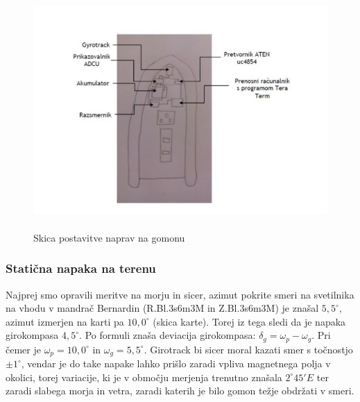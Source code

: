 \begin{figure}
	\centering
	\includegraphics[height=9cm]{Vaje/VzorecPoroc/figs/Razporeditev_opreme.pdf}
	\caption{Skica postavitve naprav na gomonu}
	\label{fig:gum_tloris}       %
\end{figure}


\subsubsection{Statična napaka na terenu}
Najprej smo opravili meritve na morju in sicer, azimut pokrite smeri na svetilnika na vhodu v mandrač Bernardin (R.Bl.3s6m3M in Z.Bl.3s6m3M) je znašal $5,5^{\circ}$, azimut izmerjen na karti pa $10,0^{\circ}$ (skica karte). Torej iz tega sledi da je napaka girokompasa $4,5^{\circ}$. Po formuli znaša deviacija girokompasa: $\delta_g = \omega_p - \omega_g$. Pri čemer je $\omega_p = 10,0^{\circ}$ in $\omega_g = 5,5^{\circ}$.
Girotrack bi sicer moral kazati smer s točnostjo $\pm 1^{\circ}$, vendar je do take napake lahko prišlo zaradi vpliva magnetnega polja v okolici, torej variacije, ki je v območju merjenja trenutno znašala $2^{\circ}45'E$ ter zaradi slabega morja in vetra, zaradi katerih je bilo gomon težje obdržati v smeri.

